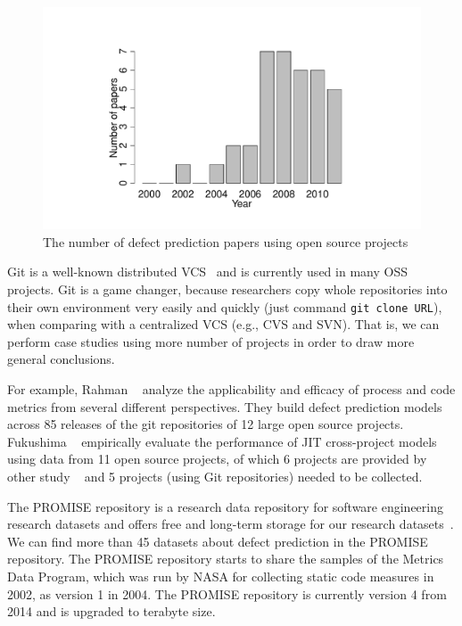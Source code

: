 \begin{figure}
  \centering
  \includegraphics[trim=100 30 100 0, scale=0.5,clip]{figures/papers}
  \caption{The number of defect prediction papers using open source projects \label{fig:oss}}
\end{figure}


Git is a well-known distributed VCS~\cite{Chacon2009Book} and is currently used in many OSS projects. Git is a game changer, because researchers copy whole repositories into their own environment very easily and quickly (just command {\tt git clone URL}), when comparing with a centralized VCS (e.g., CVS and SVN). That is, we can perform case studies using more number of projects in order to draw more general conclusions.

For example, Rahman \ea~\cite{Rahman2013ICSE} analyze the applicability and efficacy of process and code metrics from several different perspectives. They build defect prediction models across 85 releases of the git repositories of 12 large open source projects. 
Fukushima \ea~\cite{Fukushima2014MSR} empirically evaluate the performance of JIT cross-project models using data from 11 open source projects, of which 6 projects are provided
by other study ~\cite{kamei2013tse} and 5 projects (using Git repositories) needed to be collected.

The PROMISE repository is a research data repository for software engineering research datasets and offers free and long-term storage for our research datasets~\cite{promiserepo}.
We can find more than 45 datasets about defect prediction in the PROMISE repository.
The PROMISE repository starts to share the samples of the Metrics Data Program, which was run by NASA for collecting static code measures in 2002, as version 1 in 2004.
The PROMISE repository is currently version 4 from 2014 and is upgraded to terabyte size.

